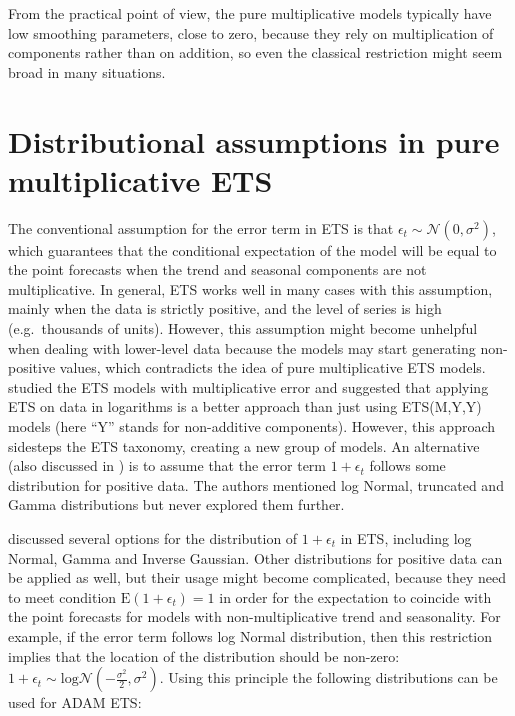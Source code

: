 \documentclass[
]{book}
\theoremstyle{definition}
\theoremstyle{definition}
\theoremstyle{definition}
\theoremstyle{definition}
\theoremstyle{remark}
\begin{document}
From the practical point of view, the pure multiplicative models typically have low smoothing parameters, close to zero, because they rely on multiplication of components rather than on addition, so even the classical restriction might seem broad in many situations.

\hypertarget{ADAMETSMultiplicativeDistributions}{%
\section{Distributional assumptions in pure multiplicative ETS}\label{ADAMETSMultiplicativeDistributions}}

The conventional assumption for the error term in ETS is that \(\epsilon_t\sim\mathcal{N}(0,\sigma^2)\), which guarantees that the conditional expectation of the model will be equal to the point forecasts when the trend and seasonal components are not multiplicative. In general, ETS works well in many cases with this assumption, mainly when the data is strictly positive, and the level of series is high (e.g.~thousands of units). However, this assumption might become unhelpful when dealing with lower-level data because the models may start generating non-positive values, which contradicts the idea of pure multiplicative ETS models. \citet{Akram2009} studied the ETS models with multiplicative error and suggested that applying ETS on data in logarithms is a better approach than just using ETS(M,Y,Y) models (here ``Y'' stands for non-additive components). However, this approach sidesteps the ETS taxonomy, creating a new group of models. An alternative (also discussed in \citet{Akram2009}) is to assume that the error term \(1+\epsilon_t\) follows some distribution for positive data. The authors mentioned log Normal, truncated and Gamma distributions but never explored them further.

\citet{Svetunkov2020ETS} discussed several options for the distribution of \(1+\epsilon_t\) in ETS, including log Normal, Gamma and Inverse Gaussian. Other distributions for positive data can be applied as well, but their usage might become complicated, because they need to meet condition \(\mathrm{E}(1+\epsilon_t)=1\) in order for the expectation to coincide with the point forecasts for models with non-multiplicative trend and seasonality. For example, if the error term follows log Normal distribution, then this restriction implies that the location of the distribution should be non-zero: \(1+\epsilon_t\sim\mathrm{log}\mathcal{N}\left(-\frac{\sigma^2}{2},\sigma^2\right)\). Using this principle the following distributions can be used for ADAM ETS:
\end{document}
